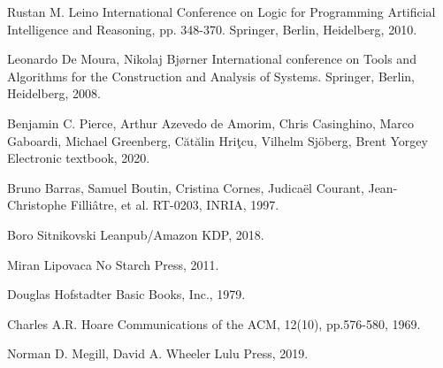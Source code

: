 \documentclass{article}
\begin{document}
\begin{thebibliography}{1}

Rustan M. Leino
\newblock International Conference on Logic for Programming Artificial Intelligence and Reasoning, pp. 348-370. Springer, Berlin, Heidelberg, 2010.

Leonardo De Moura, Nikolaj Bjørner
\newblock International conference on Tools and Algorithms for the Construction and Analysis of Systems. Springer, Berlin, Heidelberg, 2008.

Benjamin C. Pierce, Arthur Azevedo de Amorim, Chris Casinghino, Marco Gaboardi, Michael Greenberg, Cătălin Hriţcu, Vilhelm Sjöberg, Brent Yorgey
\newblock Electronic textbook, 2020.

Bruno Barras, Samuel Boutin, Cristina Cornes, Judicaël Courant, Jean-Christophe Filliâtre, et al.
 RT-0203, INRIA, 1997.

Boro Sitnikovski
\newblock Leanpub/Amazon KDP, 2018.

Miran Lipovaca
\newblock No Starch Press, 2011.

Douglas Hofstadter
\newblock Basic Books, Inc., 1979.

Charles A.R. Hoare
\newblock Communications of the ACM, 12(10), pp.576-580, 1969.

Norman D. Megill, David A. Wheeler
\newblock Lulu Press, 2019.

\end{thebibliography}
\end{document}
